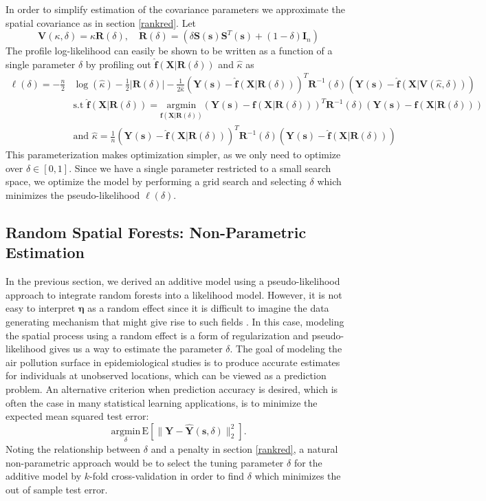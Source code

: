 \documentclass[12pt]{article}
\newcommand{\proc}{\mathbf{Y}(\mathbf{s})}
\newcommand{\covs}{\mathbf{X}}
\newcommand{\eye}{\mathbf{I} }
\newcommand{\re}{\boldsymbol{\eta}}
\newcommand{\spatbas}{\mathbf{S}(\mathbf{s})}
\newcommand{\tspatbas}{\mathbf{S}^T(\mathbf{s})}
\begin{document}
In order to simplify estimation of the covariance parameters we approximate the spatial covariance as in section \ref{rankred}. Let 
$$\mathbf{V}(\kappa,\delta) = \kappa \mathbf{R}(\delta), \quad \mathbf{R}(\delta )= \left( \delta \spatbas \tspatbas + (1-\delta) \eye_n \right)$$ 
The profile log-likelihood can easily be shown to be written as a function of a single parameter $\delta$ by profiling out $\mathbf{\hat f}(\covs | \mathbf{R}(\delta))$ and $\hat \kappa$ as
\begin{align*}
\ell(\delta) = -\frac{n}{2}&\log \left( \hat \kappa \right) -\frac{1}{2}\left|\mathbf{R}(\delta) \right| - \frac{1}{2 \hat \kappa} \left(\proc - \mathbf{ \hat f}(\covs | \mathbf{R}(\delta) ) \right)^T \mathbf{R}^{-1}(\delta) \left(\proc -\mathbf{\hat f} ( \covs | \mathbf{V}(\hat\kappa, \delta) ) \right)\\
& \text{s.t} \,\, \mathbf{\hat f} (\covs|\mathbf{R}(\delta) ) = \underset{ \mathbf{f} (\covs|\mathbf{R}(\delta)) }{\text{argmin} } \left(\proc- \mathbf{f} \left(\covs|\mathbf{R}(\delta) \right) \right)^T \mathbf{R}^{-1}(\delta) \left(\proc- \mathbf{f} \left(\covs|\mathbf{R}(\delta) \right) \right) \\
& \text{and }\hat \kappa = \frac{1}{n} (\proc- \mathbf{\hat f}(\covs|\mathbf{R}(\delta)) )^T \mathbf{R}^{-1}(\delta) ( \proc- \mathbf{\hat f}(\covs|\mathbf{R}(\delta)) )
\end{align*}
This parameterization makes optimization simpler, as we only need to optimize over $\delta \in [0,1]$. Since we have a single parameter restricted to a small search space, we optimize the model by performing a grid search and selecting $\delta$ which minimizes the pseudo-likelihood $\ell(\delta)$.

\subsection{Random Spatial Forests: Non-Parametric Estimation}
\label{spatRFNP}
In the previous section, we derived an additive model using a pseudo-likelihood approach to integrate random forests into a likelihood model. However, it is not easy to interpret $\re$ as a random effect since it is difficult to imagine the data generating mechanism that might give rise to such fields \cite{hodges2016richly}. In this case, modeling the spatial process using a random effect is a form of regularization and pseudo-likelihood gives us a way to estimate the parameter $\delta$. The goal of modeling the air pollution surface in epidemiological studies is to produce accurate estimates for individuals at unobserved locations, which can be viewed as a prediction problem. An alternative criterion when prediction accuracy is desired, which is often the case in many statistical learning applications, is to minimize the expected mean squared test error:
$$\underset{\delta}{\text{argmin}} \, \text{E} \left[ \|\mathbf{Y} - \mathbf{\hat Y}(\mathbf{s},\delta)\|_2^2 \right].$$ 
Noting the relationship between $\delta$ and a penalty in section \ref{rankred}, a natural non-parametric approach would be to select the tuning parameter $\delta$ for the additive model by $k$-fold cross-validation in order to find $\delta$ which minimizes the out of sample test error. 
\end{document}

